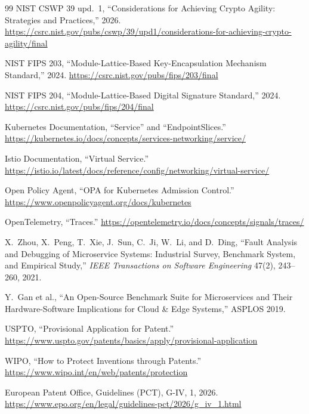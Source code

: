 \documentclass[11pt,letterpaper]{article}
\begin{document}
\begin{thebibliography}{99}
 NIST CSWP 39 upd.~1, ``Considerations for Achieving Crypto Agility: Strategies and Practices,'' 2026. \url{https://csrc.nist.gov/pubs/cswp/39/upd1/considerations-for-achieving-crypto-agility/final}

 NIST FIPS 203, ``Module-Lattice-Based Key-Encapsulation Mechanism Standard,'' 2024. \url{https://csrc.nist.gov/pubs/fips/203/final}

 NIST FIPS 204, ``Module-Lattice-Based Digital Signature Standard,'' 2024. \url{https://csrc.nist.gov/pubs/fips/204/final}

 Kubernetes Documentation, ``Service'' and ``EndpointSlices.'' \url{https://kubernetes.io/docs/concepts/services-networking/service/}

 Istio Documentation, ``Virtual Service.'' \url{https://istio.io/latest/docs/reference/config/networking/virtual-service/}

 Open Policy Agent, ``OPA for Kubernetes Admission Control.'' \url{https://www.openpolicyagent.org/docs/kubernetes}

 OpenTelemetry, ``Traces.'' \url{https://opentelemetry.io/docs/concepts/signals/traces/}

 X.~Zhou, X.~Peng, T.~Xie, J.~Sun, C.~Ji, W.~Li, and D.~Ding, ``Fault Analysis and Debugging of Microservice Systems: Industrial Survey, Benchmark System, and Empirical Study,'' \emph{IEEE Transactions on Software Engineering} 47(2), 243--260, 2021.

 Y.~Gan et al., ``An Open-Source Benchmark Suite for Microservices and Their Hardware-Software Implications for Cloud \& Edge Systems,'' ASPLOS 2019.

 USPTO, ``Provisional Application for Patent.'' \url{https://www.uspto.gov/patents/basics/apply/provisional-application}

 WIPO, ``How to Protect Inventions through Patents.'' \url{https://www.wipo.int/en/web/patents/protection}

 European Patent Office, Guidelines (PCT), G-IV, 1, 2026. \url{https://www.epo.org/en/legal/guidelines-pct/2026/g_iv_1.html}

\end{thebibliography}
\normalsize

\clearpage
\appendix
\renewcommand{\thesection}{Appendix \Alph{section}.}
\titleformat{\section}{\normalfont\large\bfseries}{\thesection}{0.5em}{}
\renewcommand{\thesubsection}{\Alph{section}.\arabic{subsection}}
\end{document}
